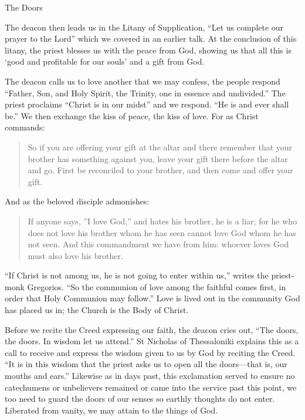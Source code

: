 \documentclass[
]{article}
\newcommand{\RL}[1]{\beginR #1\endR}
\begin{document}
The Doors

The deacon then leads us in the Litany of Supplication, ``Let us
complete our prayer to the Lord'' which we covered in an earlier talk.
At the conclusion of this litany, the priest blesses us with the peace
from God, showing us that all this is `good and profitable for our
souls' and a gift from God.

The deacon calls us to love another that we may confess, the people
respond ``Father, Son, and Holy Spirit, the Trinity, one in essence and
undivided.'' The priest proclaims ``Christ is in our midst'' and we
respond. ``He is and ever shall be.'' We then exchange the kiss of
peace, the kiss of love. For as Christ commands:

\begin{quote}
So if you are offering your gift at the altar and there remember that
your brother has something against you, leave your gift there before the
altar and go. First be reconciled to your brother, and then come and
offer your gift.
\end{quote}

And as the beloved disciple admonishes:

\begin{quote}
If anyone says, \RL{''}I love God,'' and hates his brother, he is a
liar; for he who does not love his brother whom he has seen cannot love
God whom he has not seen. And this commandment we have from him: whoever
loves God must also love his brother.
\end{quote}

``If Christ is not among us, he is not going to enter within us,''
writes the priest-monk Gregorios. ``So the communion of love among the
faithful comes first, in order that Holy Communion may follow.'' Love is
lived out in the community God has placed us in; the Church is the Body
of Christ.

Before we recite the Creed expressing our faith, the deacon cries out,
``The doors, the doors. In wisdom let us attend.'' St Nicholas of
Thessaloniki explains this as a call to receive and express the wisdom
given to us by God by reciting the Creed. ``It is in this wisdom that
the priest asks us to open all the doors---that is, our mouths and
ears.'' Likewise as in days past, this exclamation served to ensure no
catechumens or unbelievers remained or came into the service past this
point, we too need to guard the doors of our senses so earthly thoughts
do not enter. Liberated from vanity, we may attain to the things of God.
\end{document}

